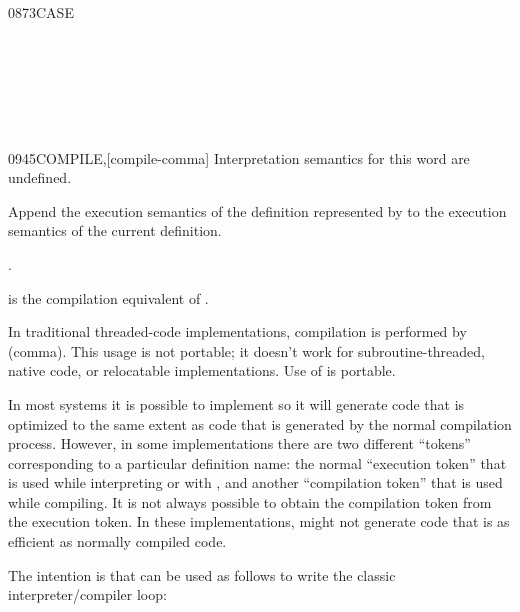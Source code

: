 \begin{worddef}{0873}{CASE}
\begin{testing}
		 \\
		 \\
		 \\
		 \\
		 \\
	\end{testing}
\end{worddef}


\begin{worddef}{0945}{COMPILE,}[compile-comma]
\interpret
	Interpretation semantics for this word are undefined.

\execute

	Append the execution semantics of the definition represented
	by  to the execution semantics of the current
	definition.

\see {}.

	\begin{rationale} %
		 is the compilation equivalent of .

		In traditional threaded-code implementations, compilation is
		performed by \word{,} (comma). This usage is not portable; it
		doesn't work for subroutine-threaded, native code, or
		relocatable implementations. Use of  is portable.

		In most systems it is possible to implement  so
		it will generate code that is optimized to the same extent as
		code that is generated by the normal compilation process.
		However, in some implementations there are two different
		``tokens'' corresponding to a particular definition name:
		the normal ``execution token'' that is used while interpreting
		or with , and another ``compilation token'' that
		is used while compiling. It is not always possible to obtain
		the compilation token from the execution token. In these
		implementations,  might not generate code that
		is as efficient as normally compiled code.

		The intention is that  can be used as follows to write
		the classic interpreter/com\-piler loop:


\end{rationale}
\end{worddef}
